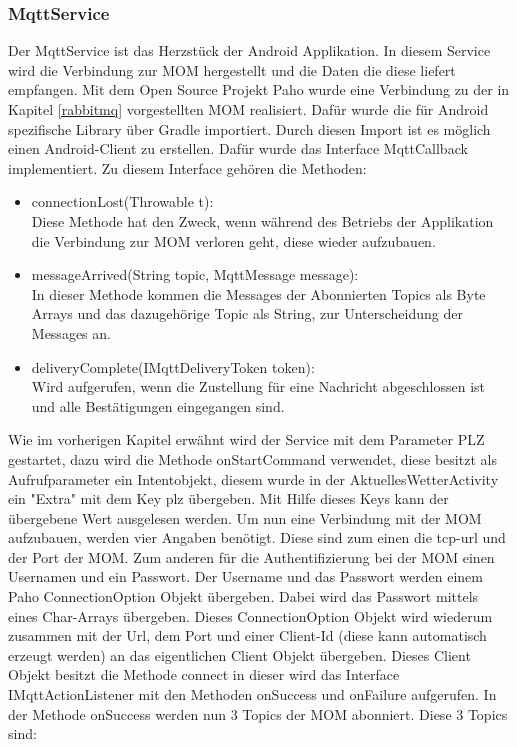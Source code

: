 \subsubsection{MqttService}
\label{subsubsec:MqttService}
Der MqttService ist das Herzstück der Android Applikation. In diesem Service wird die Verbindung zur MOM hergestellt und die Daten die diese liefert empfangen.
Mit dem Open Source Projekt Paho wurde eine Verbindung zu der in Kapitel \ref{rabbitmq} vorgestellten MOM realisiert. Dafür wurde die für Android spezifische Library über Gradle importiert. Durch diesen Import ist es möglich einen Android-Client zu erstellen. Dafür wurde das Interface MqttCallback implementiert. Zu diesem Interface gehören die Methoden: 
 \begin{itemize}
\item connectionLost(Throwable t):
\\Diese Methode hat den Zweck, wenn während des Betriebs der Applikation die Verbindung zur MOM verloren geht, diese wieder aufzubauen.
\item messageArrived(String topic, MqttMessage message):
\\In dieser Methode kommen die Messages der Abonnierten Topics als Byte Arrays und das dazugehörige Topic als String, zur Unterscheidung der Messages an.
\item deliveryComplete(IMqttDeliveryToken token):
\\Wird aufgerufen, wenn die Zustellung für eine Nachricht abgeschlossen ist und alle Bestätigungen eingegangen sind.
\end{itemize}
Wie im vorherigen Kapitel erwähnt wird der Service mit dem Parameter PLZ gestartet, dazu wird die Methode onStartCommand verwendet, diese besitzt als Aufrufparameter ein Intentobjekt, diesem wurde in der AktuellesWetterActivity ein "Extra" mit dem Key plz übergeben. Mit Hilfe dieses Keys kann der übergebene Wert ausgelesen werden. Um nun eine Verbindung mit der MOM aufzubauen, werden vier Angaben benötigt. Diese sind zum einen die tcp-url und der Port der MOM. Zum anderen für die Authentifizierung bei der MOM einen Usernamen und ein Passwort. Der Username und das Passwort werden einem Paho ConnectionOption Objekt übergeben. Dabei wird das Passwort mittels eines Char-Arrays übergeben. Dieses ConnectionOption Objekt wird wiederum zusammen mit der Url, dem Port und einer Client-Id (diese kann automatisch erzeugt werden) an das eigentlichen Client Objekt übergeben. Dieses Client Objekt besitzt die Methode connect in dieser wird das Interface IMqttActionListener mit den Methoden onSuccess und onFailure aufgerufen. In der Methode onSuccess werden nun 3 Topics der MOM abonniert. Diese 3 Topics sind:
